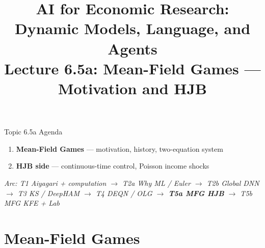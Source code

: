 


\graphicspath{{./pic/}{../../MiniCourse_8hr/Slides/Module2_DL_RL_Macro/pic/}{../}}

\title[AI for Econ Research]{AI for Economic Research: Dynamic Models, Language, and Agents\\
Lecture 6.5a: Mean-Field Games --- Motivation and HJB}



\makebeamertitle

\begin{frame}{Topic 6.5a Agenda}
\begin{enumerate}
  \item \textbf{Mean-Field Games} --- motivation, history, two-equation system
  \medskip
  \item \textbf{HJB side} --- continuous-time control, Poisson income shocks
\end{enumerate}
\medskip
\textit{Arc: T1 Aiyagari + computation $\to$ T2a Why ML / Euler $\to$ T2b Global DNN $\to$ T3 KS / DeepHAM $\to$ T4 DEQN / OLG $\to$ \textbf{T5a MFG HJB} $\to$ T5b MFG KFE + Lab}
\end{frame}

\section{Mean-Field Games}

